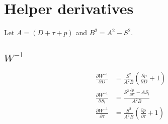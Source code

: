 \documentclass{article}
\begin{document}
\section{Helper derivatives}
Let $A = (D + \tau + p)$ and $B^2=A^2 - S^2$.
\subsection{$W^{-1}$}
\begin{align*}
  \frac{\partial W^{-1}}{\partial D} &= \frac{S^{2}}{A^{2} B} \left(\frac{\partial p}{\partial D} + 1\right)\\
  \frac{\partial W^{-1}}{\partial S_i} &= \frac{S^{2} \frac{\partial p}{\partial S_i} - A S_i }{A^{2} B}\\
  \frac{\partial W^{-1}}{\partial \tau} &= \frac{S^{2}}{A^{2} B} \left(\frac{\partial p}{\partial \tau} + 1\right)
\end{align*}
\end{document}

